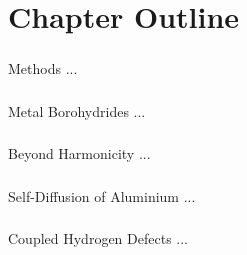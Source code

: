 \section{Chapter Outline}
\label{sec:chapters}

\subsubsection{}
Methods ...

\subsubsection{}
Metal Borohydrides ...

\subsubsection{}
Beyond Harmonicity ...

\subsubsection{}
Self-Diffusion of Aluminium ...

\subsubsection{}
Coupled Hydrogen Defects ...

